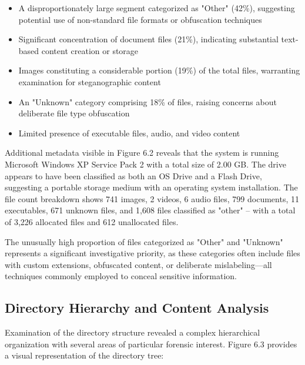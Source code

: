 \begin{itemize}
    \item A disproportionately large segment categorized as "Other" (42\%), suggesting potential use of non-standard file formats or obfuscation techniques
    \item Significant concentration of document files (21\%), indicating substantial text-based content creation or storage
    \item Images constituting a considerable portion (19\%) of the total files, warranting examination for steganographic content
    \item An "Unknown" category comprising 18\% of files, raising concerns about deliberate file type obfuscation
    \item Limited presence of executable files, audio, and video content
\end{itemize}

Additional metadata visible in Figure 6.2 reveals that the system is running Microsoft Windows XP Service Pack 2 with a total size of 2.00 GB. The drive appears to have been classified as both an OS Drive and a Flash Drive, suggesting a portable storage medium with an operating system installation. The file count breakdown shows 741 images, 2 videos, 6 audio files, 799 documents, 11 executables, 671 unknown files, and 1,608 files classified as "other" – with a total of 3,226 allocated files and 612 unallocated files.

The unusually high proportion of files categorized as "Other" and "Unknown" represents a significant investigative priority, as these categories often include files with custom extensions, obfuscated content, or deliberate mislabeling—all techniques commonly employed to conceal sensitive information.

\subsection{Directory Hierarchy and Content Analysis}
Examination of the directory structure revealed a complex hierarchical organization with several areas of particular forensic interest. Figure 6.3 provides a visual representation of the directory tree:

